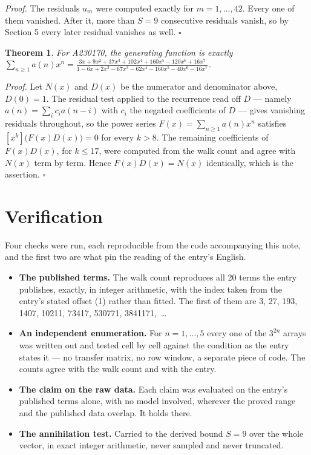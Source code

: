 \documentclass[11pt]{article}
\newtheorem{theorem}{Theorem}
\theoremstyle{definition}
\begin{document}
{\itshape Proof.} The residuals $u_m$ were computed exactly for $m = 1,\dots,42$. Every one of them vanished. After it, more than $S = 9$ consecutive residuals vanish, so by Section 5 every later residual vanishes as well. $\square$

\begin{theorem} For A230170, the generating function is exactly $\sum_{n\ge 1} a(n)x^n = \frac{3x + 9x^{2} + 37x^{3} + 102x^{4} + 160x^{5} - 120x^{6} + 16x^{7}}{1 - 6x + 2x^{2} - 67x^{3} - 62x^{4} - 160x^{5} - 40x^{6} - 16x^{7}}$.\end{theorem}

{\itshape Proof.} Let $N(x)$ and $D(x)$ be the numerator and denominator above, $D(0)=1$. The residual test applied to the recurrence read off $D$ --- namely $a(n) = \sum_i c_i a(n-i)$ with $c_i$ the negated coefficients of $D$ --- gives vanishing residuals throughout, so the power series $F(x)=\sum_{n\ge 1}a(n)x^n$ satisfies $[x^k]\bigl(F(x)D(x)\bigr) = 0$ for every $k > 8$. The remaining coefficients of $F(x)D(x)$, for $k \le 17$, were computed from the walk count and agree with $N(x)$ term by term. Hence $F(x)D(x) = N(x)$ identically, which is the assertion. $\square$

\section{Verification}

Four checks were run, each reproducible from the code accompanying this note, and the first two are what pin the reading of the entry's English.

\begin{itemize}

\item {\bfseries The published terms.} The walk count reproduces all 20 terms the entry publishes, exactly, in integer arithmetic, with the index taken from the entry's stated offset (1) rather than fitted. The first of them are 3, 27, 193, 1407, 10211, 73417, 530771, 3841171,~\dots

\item {\bfseries An independent enumeration.} For $n = 1,\dots,5$ every one of the $3^{2n}$ arrays was written out and tested cell by cell against the condition as the entry states it --- no transfer matrix, no row window, a separate piece of code. The counts agree with the walk count and with the entry.

\item {\bfseries The claim on the raw data.} Each claim was evaluated on the entry's published terms alone, with no model involved, wherever the proved range and the published data overlap. It holds there.

\item {\bfseries The annihilation test.} Carried to the derived bound $S = 9$ over the whole vector, in exact integer arithmetic, never sampled and never truncated.

\end{itemize}
\end{document}
